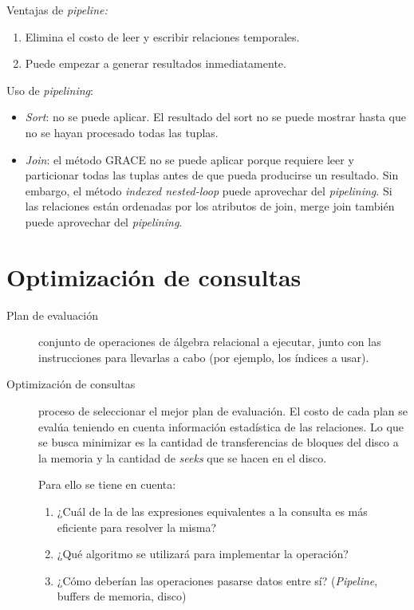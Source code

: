 \documentclass[a4paper, twoside]{article}
\begin{document}
Ventajas de \emph{pipeline:}
\begin{enumerate}
	\item Elimina el costo de leer y escribir relaciones temporales.
	\item Puede empezar a generar resultados inmediatamente.
\end{enumerate}

Uso de \emph{pipelining}:
\begin{itemize}
	\item \emph{Sort}: no se puede aplicar. El resultado del sort no se puede mostrar hasta que no se hayan procesado todas las tuplas.
	\item \emph{Join}: el método GRACE no se puede aplicar porque requiere leer y particionar todas las tuplas antes de que pueda producirse un resultado. Sin embargo, el método \emph{indexed nested-loop} puede aprovechar del \emph{pipelining}. Si las relaciones están ordenadas por los atributos de join, merge join también puede aprovechar del \emph{pipelining}.
\end{itemize}

\section{Optimización de consultas}
\begin{description}
	\item[Plan de evaluación] conjunto de operaciones de álgebra relacional a ejecutar, junto con las instrucciones para llevarlas a cabo (por ejemplo, los índices a usar).
	\item[Optimización de consultas] proceso de seleccionar el mejor plan de evaluación. El costo de cada plan se evalúa teniendo en cuenta información estadística de las relaciones. Lo que se busca minimizar es la cantidad de transferencias de bloques del disco a la memoria y la cantidad de \emph{seeks} que se hacen en el disco. 

	Para ello se tiene en cuenta:
	\begin{enumerate}
		\item ¿Cuál de la de las expresiones equivalentes a la consulta es más eficiente para resolver la misma?
		\item ¿Qué algoritmo se utilizará para implementar la operación?
		\item ¿Cómo deberían las operaciones pasarse datos entre sí? (\emph{Pipeline}, buffers de memoria, disco)
	\end{enumerate}
\end{description}
\end{document}
